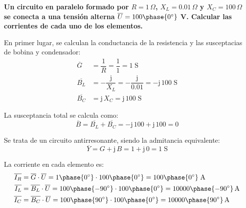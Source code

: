 \documentclass[11pt]{book} %
\begin{document}
	\vspace{4mm}
	\begin{example}\label{ej.2-5}
		\textbf{Un circuito en paralelo formado por $R=1\,\Omega$, ${X_L}=0.01\,\Omega$ y ${X_C}=100\,\Omega$ se conecta a una tensión alterna $\overline{U}=100\phase{0^\circ}$ V. Calcular las corrientes de cada uno de los elementos.}
		
		En primer lugar, se calculan la conductancia de la resistencia y las susceptacias de bobina y condensador: 
		\begin{align*}
			\overline{G}&=\dfrac{1}{R}=\dfrac{1}{1}=1\;\text{S}\\
			\overline{B_L}&=-\dfrac{\mathrm{j}}{X_L}=-\dfrac{\mathrm{j}}{0.01}=-\mathrm{j}\,100\;\text{S}\\
			\overline{B_C}&=\mathrm{j}\,X_C=\mathrm{j}\,100\;\text{S}
		\end{align*}
		
		La susceptancia total se calcula como:
		\begin{equation*}
			\overline{B}= \overline{B_L}+\overline{B_C}=-\mathrm{j}\,100+\mathrm{j}\,100=0
		\end{equation*}
		
		Se trata de un circuito antirresonante, siendo la admitancia equivalente:
		\begin{equation*}
			\overline{Y}=G+\mathrm{j}\,B=1+\mathrm{j}\,0=1\;\text{S}
		\end{equation*}
		
		La corriente en cada elemento es:
		\begin{align*}
			\overline{I_R}&=\overline{G}\cdot \overline{U}={1\phase{0^\circ}}\cdot {100\phase{0^\circ}}=100\phase{0^\circ}\;\text{A}\\
			\overline{I_L}&=\overline{B_L}\cdot\overline{U}=100\phase{-90^\circ}\cdot 100\phase{0^\circ}=10000\phase{-90^\circ}\,\text{A}\\
			\overline{I_C}&=\overline{B_C}\cdot\overline{U}=100\phase{90^\circ}\cdot 100\phase{0^\circ}=10000\phase{90^\circ}\,\text{A}
		\end{align*}
	\end{example}
	
	
	
	
\end{document}
